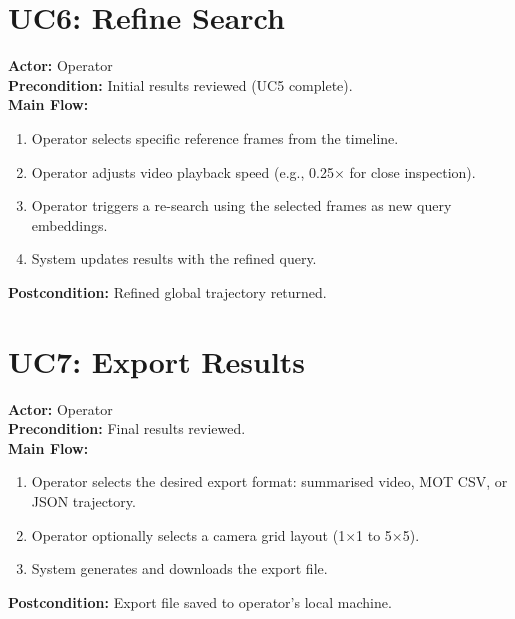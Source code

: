 \section*{UC6: Refine Search}
\textbf{Actor:} Operator \\
\textbf{Precondition:} Initial results reviewed (UC5 complete). \\
\textbf{Main Flow:}
\begin{enumerate}
    \item Operator selects specific reference frames from the timeline.
    \item Operator adjusts video playback speed (e.g., 0.25$\times$ for close inspection).
    \item Operator triggers a re-search using the selected frames as new query embeddings.
    \item System updates results with the refined query.
\end{enumerate}
\textbf{Postcondition:} Refined global trajectory returned.

\section*{UC7: Export Results}
\textbf{Actor:} Operator \\
\textbf{Precondition:} Final results reviewed. \\
\textbf{Main Flow:}
\begin{enumerate}
    \item Operator selects the desired export format: summarised video, MOT CSV, or JSON trajectory.
    \item Operator optionally selects a camera grid layout (1$\times$1 to 5$\times$5).
    \item System generates and downloads the export file.
\end{enumerate}
\textbf{Postcondition:} Export file saved to operator's local machine.
